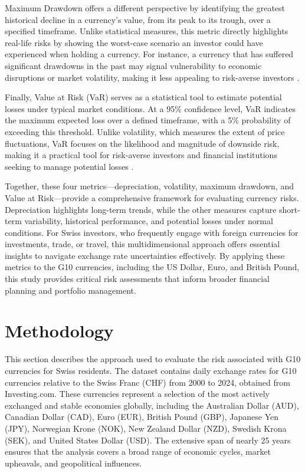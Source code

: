 \documentclass[11pt,a4paper,english,oneside]{book}
\begin{document}
Maximum Drawdown offers a different perspective by identifying the greatest historical decline in a currency's value, from its peak to its trough, over a specified timeframe. Unlike statistical measures, this metric directly highlights real-life risks by showing the worst-case scenario an investor could have experienced when holding a currency. For instance, a currency that has suffered significant drawdowns in the past may signal vulnerability to economic disruptions or market volatility, making it less appealing to risk-averse investors \parencite{geboers2023peak}.

Finally, Value at Risk (VaR) serves as a statistical tool to estimate potential losses under typical market conditions. At a 95\% confidence level, VaR indicates the maximum expected loss over a defined timeframe, with a 5\% probability of exceeding this threshold. Unlike volatility, which measures the extent of price fluctuations, VaR focuses on the likelihood and magnitude of downside risk, making it a practical tool for risk-averse investors and financial institutions seeking to manage potential losses \parencite{poon2003forecasting}.

Together, these four metrics—depreciation, volatility, maximum drawdown, and Value at Risk—provide a comprehensive framework for evaluating currency risks. Depreciation highlights long-term trends, while the other measures capture short-term variability, historical performance, and potential losses under normal conditions. For Swiss investors, who frequently engage with foreign currencies for investments, trade, or travel, this multidimensional approach offers essential insights to navigate exchange rate uncertainties effectively. By applying these metrics to the G10 currencies, including the US Dollar, Euro, and British Pound, this study provides critical risk assessments that inform broader financial planning and portfolio management.

\chapter{Methodology}
This section describes the approach used to evaluate the risk associated with G10 currencies for Swiss residents. The dataset contains daily exchange rates for G10 currencies relative to the Swiss Franc (CHF) from 2000 to 2024, obtained from Investing.com. These currencies represent a selection of the most actively exchanged and stable economies globally, including the Australian Dollar (AUD), Canadian Dollar (CAD), Euro (EUR), British Pound (GBP), Japanese Yen (JPY), Norwegian Krone (NOK), New Zealand Dollar (NZD), Swedish Krona (SEK), and United States Dollar (USD). The extensive span of nearly 25 years ensures that the analysis covers a broad range of economic cycles, market upheavals, and geopolitical influences.
\end{document}
